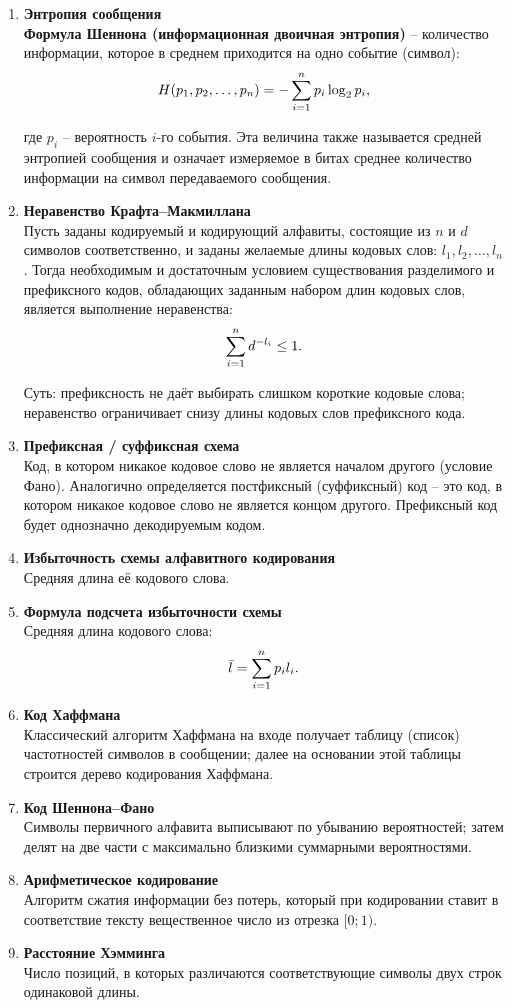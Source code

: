\documentclass[a4paper,12pt,oneside]{article}
\newcommand{\BigDisp}[1]{%
\[
{\Large\displaystyle #1}
\]
}
\newcommand{\DefItem}[2]{\item \textbf{#1}\\#2}
\begin{document}
\begin{enumerate}[label=\arabic*.]
\DefItem{Энтропия сообщения}{\textbf{Формула Шеннона (информационная двоичная энтропия)} – количество информации, которое в среднем приходится на одно событие (символ):
\BigDisp{H(p_1,p_2,\dots,p_n)= -\sum_{i=1}^{n} p_i \log_2 p_i,}
где $p_i$ – вероятность $i$-го события. Эта величина также называется средней энтропией сообщения и означает измеряемое в битах среднее количество информации на символ передаваемого сообщения.}

\DefItem{Неравенство Крафта–Макмиллана}{Пусть заданы кодируемый и кодирующий алфавиты, состоящие из $n$ и $d$ символов соответственно, и заданы желаемые длины кодовых слов: $l_1,l_2,\dots,l_n$. Тогда необходимым и достаточным условием существования разделимого и префиксного кодов, обладающих заданным набором длин кодовых слов, является выполнение неравенства:
\BigDisp{\sum_{i=1}^{n} d^{-l_i}\le 1.}
Суть: префиксность не даёт выбирать слишком короткие кодовые слова; неравенство ограничивает снизу длины кодовых слов префиксного кода.}

\clearpage

\DefItem{Префиксная / суффиксная схема}{Код, в котором никакое кодовое слово не является началом другого (условие Фано). Аналогично определяется постфиксный (суффиксный) код – это код, в котором никакое кодовое слово не является концом другого. Префиксный код будет однозначно декодируемым кодом.}

\DefItem{Избыточность схемы алфавитного кодирования}{Средняя длина её кодового слова.}

\DefItem{Формула подсчета избыточности схемы}{Средняя длина кодового слова:
\BigDisp{\bar l=\sum_{i=1}^{n} p_i l_i.}}

\DefItem{Код Хаффмана}{Классический алгоритм Хаффмана на входе получает таблицу (список) частотностей символов в сообщении; далее на основании этой таблицы строится дерево кодирования Хаффмана.}

\DefItem{Код Шеннона--Фано}{Символы первичного алфавита выписывают по убыванию вероятностей; затем делят на две части с максимально близкими суммарными вероятностями.}

\DefItem{Арифметическое кодирование}{Алгоритм сжатия информации без потерь, который при кодировании ставит в соответствие тексту вещественное число из отрезка $[0;1)$.}

\DefItem{Расстояние Хэмминга}{Число позиций, в которых различаются соответствующие символы двух строк одинаковой длины.}

\end{enumerate}
\end{document}
